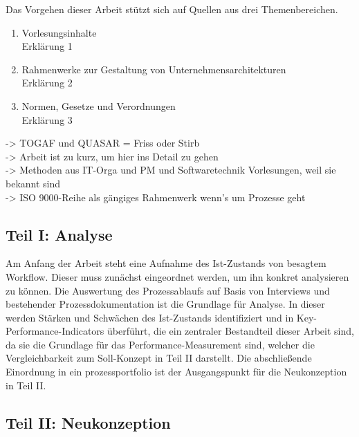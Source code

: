 Das Vorgehen dieser Arbeit stützt sich auf Quellen aus drei Themenbereichen.

\begin{enumerate}

\item{Vorlesungsinhalte}
\\ Erklärung 1

\item{Rahmenwerke zur Gestaltung von Unternehmensarchitekturen}
\\ Erklärung 2

\item{Normen, Gesetze und Verordnungen}
\\ Erklärung 3
\end{enumerate}


-> TOGAF und QUASAR = Friss oder Stirb \\
-> Arbeit ist zu kurz, um hier ins Detail zu gehen\\
-> Methoden aus IT-Orga und PM und Softwaretechnik Vorlesungen, weil sie bekannt sind\\
-> ISO 9000-Reihe als gängiges Rahmenwerk wenn's um Prozesse geht\\
\subsection{Teil I: Analyse}

Am Anfang der Arbeit steht eine Aufnahme des Ist-Zustands von besagtem Workflow. Dieser muss zunächst eingeordnet werden, um ihn konkret analysieren zu können. 
Die Auswertung des Prozessablaufs auf Basis von Interviews und bestehender Prozessdokumentation ist die Grundlage für Analyse. 
In dieser werden Stärken und Schwächen des Ist-Zustands identifiziert und in Key-Performance-Indicators überführt, die ein zentraler Bestandteil dieser Arbeit sind, da sie die Grundlage für das Performance-Measurement sind, welcher die Vergleichbarkeit zum Soll-Konzept in Teil II darstellt. 
Die abschließende Einordnung in ein prozessportfolio ist der Ausgangspunkt für die Neukonzeption in Teil II.

\subsection{Teil II: Neukonzeption}

